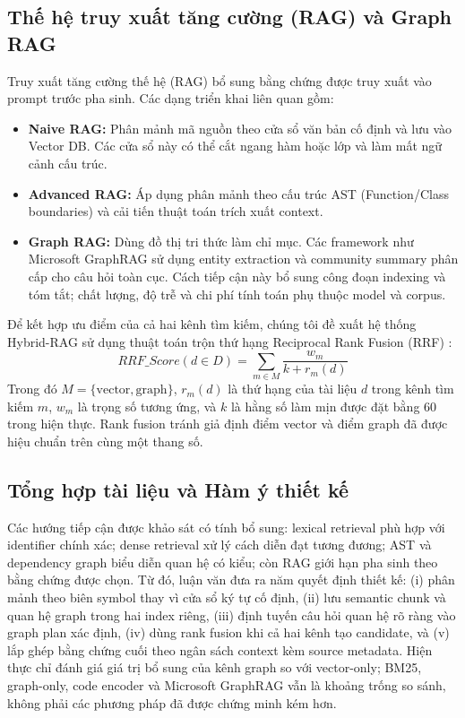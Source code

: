 \documentclass[12pt,a4paper,oneside]{report}
\begin{document}
\subsection{Thế hệ truy xuất tăng cường (RAG) và Graph RAG}
Truy xuất tăng cường thế hệ (RAG) \cite{lewis2020rag} bổ sung bằng chứng được truy xuất vào prompt trước pha sinh. Các dạng triển khai liên quan gồm:
\begin{itemize}
    \item \textbf{Naive RAG:} Phân mảnh mã nguồn theo cửa sổ văn bản cố định và lưu vào Vector DB. Các cửa sổ này có thể cắt ngang hàm hoặc lớp và làm mất ngữ cảnh cấu trúc.
    \item \textbf{Advanced RAG:} Áp dụng phân mảnh theo cấu trúc AST (Function/Class boundaries) và cải tiến thuật toán trích xuất context.
    \item \textbf{Graph RAG:} Dùng đồ thị tri thức làm chỉ mục. Các framework như Microsoft GraphRAG \cite{edge2024graphrag} sử dụng entity extraction và community summary phân cấp cho câu hỏi toàn cục. Cách tiếp cận này bổ sung công đoạn indexing và tóm tắt; chất lượng, độ trễ và chi phí tính toán phụ thuộc model và corpus.
\end{itemize}
Để kết hợp ưu điểm của cả hai kênh tìm kiếm, chúng tôi đề xuất hệ thống Hybrid-RAG sử dụng thuật toán trộn thứ hạng Reciprocal Rank Fusion (RRF) \cite{cormack2009rrf}:
\begin{equation}
    RRF\_Score(d \in D) = \sum_{m \in M} \frac{w_m}{k + r_m(d)}
\end{equation}
Trong đó $M = \{\text{vector}, \text{graph}\}$, $r_m(d)$ là thứ hạng của tài liệu $d$ trong kênh tìm kiếm $m$, $w_m$ là trọng số tương ứng, và $k$ là hằng số làm mịn được đặt bằng 60 trong hiện thực. Rank fusion tránh giả định điểm vector và điểm graph đã được hiệu chuẩn trên cùng một thang số.

\subsection{Tổng hợp tài liệu và Hàm ý thiết kế}
Các hướng tiếp cận được khảo sát có tính bổ sung: lexical retrieval phù hợp với identifier chính xác; dense retrieval xử lý cách diễn đạt tương đương; AST và dependency graph biểu diễn quan hệ có kiểu; còn RAG giới hạn pha sinh theo bằng chứng được chọn. Từ đó, luận văn đưa ra năm quyết định thiết kế: (i) phân mảnh theo biên symbol thay vì cửa sổ ký tự cố định, (ii) lưu semantic chunk và quan hệ graph trong hai index riêng, (iii) định tuyến câu hỏi quan hệ rõ ràng vào graph plan xác định, (iv) dùng rank fusion khi cả hai kênh tạo candidate, và (v) lắp ghép bằng chứng cuối theo ngân sách context kèm source metadata. Hiện thực chỉ đánh giá giá trị bổ sung của kênh graph so với vector-only; BM25, graph-only, code encoder và Microsoft GraphRAG vẫn là khoảng trống so sánh, không phải các phương pháp đã được chứng minh kém hơn.
\end{document}
